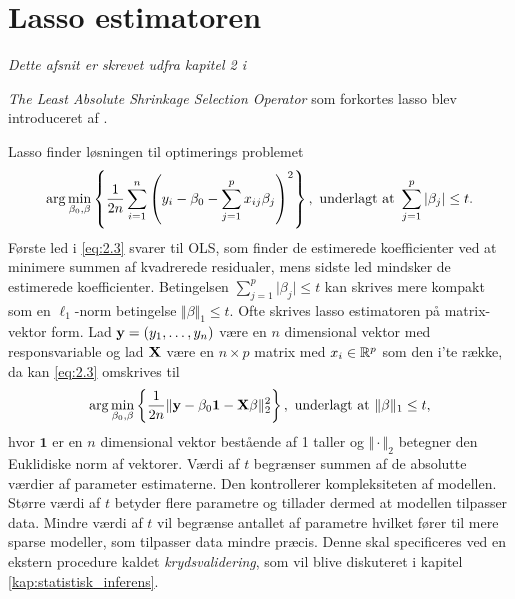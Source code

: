 \section{Lasso estimatoren} \label{sec:lasso_estimatoren}
\textit{Dette afsnit er skrevet udfra kapitel 2 i \citep{hastie}}


\textit{The Least Absolute Shrinkage Selection Operator} som forkortes lasso blev introduceret af \citep{lasso}. 


Lasso finder løsningen til optimerings problemet
\begin{align}
\arg \min_{\beta_0, \beta} \cbr{\frac{1}{2n} \sum_{i=1}^n \del{y_i - \beta_0 - \sum_{j=1}^p x_{ij} \beta_j}^2}, \ \text{underlagt at } \sum_{j=1}^p \vert \beta_j \vert \leq t. \label{eq:2.3}
\end{align}
Første led i \eqref{eq:2.3} svarer til OLS, som finder de estimerede koefficienter ved at minimere summen af kvadrerede residualer, mens sidste led mindsker de estimerede koefficienter. 
Betingelsen $\sum_{j=1}^p \vert \beta_j \vert \leq t$ kan skrives mere kompakt som en \(\ell_1\)-norm betingelse $\Vert \beta \Vert_1 \leq t$.
Ofte skrives lasso estimatoren på matrix-vektor form.
Lad \(\mathbf{y}=(y_1, \ldots, y_n)\) være en \(n\) dimensional vektor med responsvariable og lad \(\mathbf{X}\) være en $n \times p$ matrix med $x_i \in \mathbb{R}^p$ som den i'te række, da kan \eqref{eq:2.3} omskrives til
\begin{align*}
\arg \min_{\beta_0, \beta} \cbr{\frac{1}{2n} \Vert \y - \beta_0 \mathbf{1} - \X \beta \Vert_2^2}, \ \text{underlagt at } \Vert \beta \Vert_1 \leq t,
\end{align*}
hvor \(\mathbf{1}\) er en \(n\) dimensional vektor bestående af 1 taller og \(\Vert \cdot \Vert_2\) betegner den Euklidiske norm af vektorer.
Værdi af \(t\) begrænser summen af de absolutte værdier af parameter estimaterne.
Den kontrollerer kompleksiteten af modellen. 
Større værdi af \(t\) betyder flere parametre og tillader dermed at modellen tilpasser data.
Mindre værdi af \(t\) vil begrænse antallet af parametre hvilket fører til mere sparse modeller, som tilpasser data mindre præcis.
Denne skal specificeres ved en ekstern procedure kaldet \textit{krydsvalidering}, som vil blive diskuteret i kapitel \ref{kap:statistisk_inferens}.

